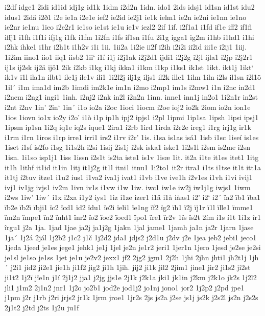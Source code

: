 i2df
idge1
2idi
id1id
idj1g
id1k
1idm
i2d2n
1idn.
ido1
2ids
idsj1
id1sn
id1st
idu2
idus1
2idä
i2ð1
i2e
ie1a
i2e1e
ief2
ie2id
ie2j1
ie1k
ielm1
ie2n
ie2ni
ie1nn
ie1no
ie2nr
ie1nu
1ieo
i2e2r1
ie1so
ie1st
ie1u
ie1v
iezl2
2if
1if.
i2f1a1
i1fd
if1e
iff2
if1fi
iffj1
i1fh
i1f1i
ifj1g
i1fk
i1fm
1i2fn
i1fs
if1sn
i1fu
2i1g
igga1
ig2m
i1hb
i1hd1
i1hi
i2hk
ihke1
i1hr
i2h1t
i1h2v
i1i
1ii.
1ii2a
1i2ie
ii2f
i2ih
i2i2i
ii2id
iii1e
i2ij1
1iij.
1i2im
iino1
iio1
iiq1
iisb2
1ii`
i1í
i1j
i2j1ak
i2j2d1
ijdi1
i2j2g
i2jl
ijla1
i2jp
i2j2r1
ij1s
ij2sk
ij2ä
ijö1
2ik
i2kb
i1kg
i1kj
ikka1
i1km
i1kp
i1ks1
ik1st
1ikt.
ikt1j
1ikt`
ik1v
i1l
ila1n
ilbt1
ile1j
ile1v
ili1
1i2l2j
ilj1g
iljs1
il2k
ille1
1ilm
1iln
i2ls
il1sn
i2l1ö
1il´
i1m
ima1d
im2b
1imdi
im2k1e
im1n
i2mo
i2mp1
im1s
i2mw1
i1n
i2nc
in2d1
i2nem
i2ng1
ingi1
1inh.
i2nj2
i2nk
in2l
i2n2n
1inn.
inne1
inn1j
in2o1
1i2n1r
in2st
i2nt
i2nv
1in'
2in`
1in´
i1o
io2a
i2oc
1ioci
1iocm
i2oe
ioj2
io2k
2iom
io2n
ion1e
1ios
1iovn
io1x
io2y
i2o'
i1ò
i1p
ip1h
ipj2
ipjs1
i2pl
1ipmi
1ip1sa
1ipsh
1ipsi
ipsj1
1ipsm
ip1sn
1i2q
iq1e
iq2s
ique1
2ira1
i2rb
1ird
1irda
i2r2e
ireg1
i1rg
irj1g
ir1k
i1rm
i1rn
1iros
i1rp
irre1
irri1
irs2
i1rv
i2r'
1is.
i1sa
is1as
isá1
1isb
i1sc
1iseí
is1es
1iset
i1sf
is2fo
i1sg
1i1s2h
i2si
1isij
2is1j
i2sk
iska1
iske1
1i2s1l
i2sm
is2me
i2sn
1isn.
1i1so
isp1j1
1iss
1issn
i2s1t
is2ta
iste1
is1v
1isæ
1it.
it2a
i1te
it1es
itet1
1itg
it1h
1ithf
it1id
it1in
1itj
it1j2g
it1l
itni1
itnu1
1i2to1
it2r
itra1
i1ts
i1tse
it1t
itt1a
it1tj
i2tuv
itze1
i1u2
ius1
i1va2
iva1j
ivat1
i1vb
i1ve
ive1h
i2v1es
i1vh
i1vi
ivij1
ivj1
iv1jg
ivjs1
iv2m
1ivn
iv1s
i1vw
i1w
1iw.
iwc1
iw1e
iw2j
iw1j1g
iwjs1
1iwm
i2ws
1iw'
1iw´
i1x
i2xa
i1y2
iys1
1iz
i1ze
izer1
i1ä
i1å
iåas1
i2'
i2`
i2´
ïa2
ïb1
ïba1
ïb2e
ïb2ï
ïbji1
ïc2
ïcd1
ïd2
ïdu1
ïe2i
ïeli1
ïe1ng
ïf2
ïg2
ïh1
ï2j
ïj1r
ï1l
ïlle1
ïmme1
ïm2n
ïmpe1
ïn2
ïnht1
ïnr2
ïo2
ïoe2
ïoed1
ïpo1
ïre1
ïr2v
1ïs
ïs2t
2ím
í1s
í1t
1í1z
îr1
îrgu1
j2a
1ja.
1jad
1jae
ja2j
ja1j2g
1jakn
1jal
jame1
1jamh
ja1n
ja2r
1jarn
1jase
1ja´
1j2á
2jál
1j2b2
j1c2
j1č
1j2d2
jda1
jdjs2
j2d1u
j2dv
j2e
1jea
jeb2
jebi1
jeco1
1jeda
1jeed
je1es
jege1
jehk1
je1j
1jel
je2n
je1r2
jeri1
1jer1n
1jero
1jesd
je2se
je2si
je1sl
je1so
je1ss
1jet
je1u
je2v2
jexx1
jf2
2jg2
jgm1
2j2h
1jhi
2jhn
jhti1
jh2t1j
1jh´
j2i1
jid2
ji2e1
jie1h
ji1f2
jig2
ji1h
1jih.
jij2
ji1k
jil2
2jim1
jine1
jir2
ji1s2
ji2st
ji1t2
1j2ï
jïe1n
j1í
2j1j2
jja1
j2jg
jjs1e
2j1k
j2k1a
jki1
jk1in
j2km
j2k1o
jk2s
1j2l2
jli1
j1m2
2j1n2
jnr1
1j2o
jo2b1
jod2e
jod1j2
jo1nj
jono1
jor2
1j2p2
j2pd
jpe1
j1pm
j2r
j1rb
j2ri
jrjs2
jr1k
1jrm
jroe1
1jr2s
2js
js2a
j2se
js1j
js2k
j2s2l
js2n
j2s2s
2j1t2
j2td
j2ts
1j2u
ju1f
